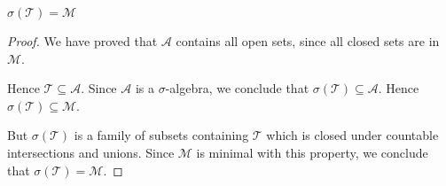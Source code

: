 \documentclass{unswmaths}
\begin{document}
\begin{theorem}
    $\sigma(\mathcal{T}) = \mathcal{M}$
\end{theorem}
\begin{proof}
    We have proved that $\mathcal{A}$ contains all open sets,
    since all closed sets are in $\mathcal{M}$.
    
    Hence $\mathcal{T} \subseteq \mathcal{A}$. Since $\mathcal{A}$
    is a $\sigma$-algebra, we conclude that $\sigma(\mathcal{T}) \subseteq \mathcal{A}$. 
    Hence $\sigma(\mathcal{T}) \subseteq \mathcal{M}$.
    
    But $\sigma(\mathcal{T})$ is a family of subsets containing $\mathcal{T}$
    which is closed under countable intersections and unions. Since $\mathcal{M}$
    is minimal with this property, we conclude that $\sigma(\mathcal{T}) = \mathcal{M}$.
\end{proof}
\end{document}
